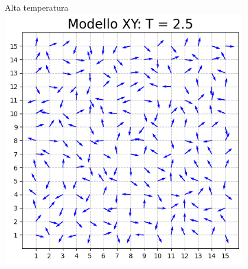 \begin{frame}
\begin{columns}
\begin{column}{0.5\textwidth}
\begin{block}{Alta temperatura}
                \centering
                \includegraphics[width=0.8\textwidth]{Immagini/simXY/conf_T2.5.png}

            \end{block}
        \end{column}
    \end{columns}

\end{frame}



